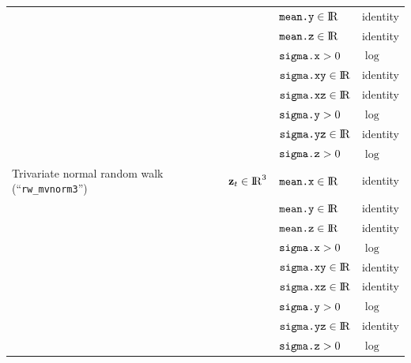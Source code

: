 \documentclass[12pt]{article}\usepackage[]{graphicx}\usepackage[]{color}
\begin{document}
\begin{small}
\begin{table}
\begin{tabular}{llll}
  \rowcolor{Gray}                                       &                                 & $\verb|mean.y|\in{\rm I\!R}$     &  identity \tabularnewline  
  \rowcolor{Gray}                                       &                                 & $\verb|mean.z|\in{\rm I\!R}$     &  identity \tabularnewline  
  \rowcolor{Gray}                                       &                                 & $\verb|sigma.x|>0$               &  $\log$ \tabularnewline                                                
  \rowcolor{Gray}                                       &                                 & $\verb|sigma.xy|\in{\rm I\!R}$   &  identity \tabularnewline
  \rowcolor{Gray}                                       &                                 & $\verb|sigma.xz|\in{\rm I\!R}$   &  identity \tabularnewline          
  \rowcolor{Gray}                                       &                                 & $\verb|sigma.y|>0$               &  $\log$ \tabularnewline   
  \rowcolor{Gray}                                       &                                 & $\verb|sigma.yz|\in{\rm I\!R}$   &  identity \tabularnewline  
  \rowcolor{Gray}                                       &                                 & $\verb|sigma.z|>0$               &  $\log$ \tabularnewline
  Trivariate normal random walk (``\verb|rw_mvnorm3|'') & ${\mathbf z_t}\in{\rm I\!R}^3$  & $\verb|mean.x|\in{\rm I\!R}$     &  identity \tabularnewline  
                                                        &                                 & $\verb|mean.y|\in{\rm I\!R}$     &  identity \tabularnewline  
                                                        &                                 & $\verb|mean.z|\in{\rm I\!R}$     &  identity \tabularnewline  
                                                        &                                 & $\verb|sigma.x|>0$               &  $\log$ \tabularnewline                                                                                                                      &                                 & $\verb|sigma.xy|\in{\rm I\!R}$   &  identity \tabularnewline    
                                                        &                                 & $\verb|sigma.xz|\in{\rm I\!R}$   &  identity \tabularnewline 
                                                        &                                 & $\verb|sigma.y|>0$               &  $\log$ \tabularnewline   
                                                        &                                 & $\verb|sigma.yz|\in{\rm I\!R}$   &  identity \tabularnewline  
                                                        &                                 & $\verb|sigma.z|>0$               &  $\log$ \tabularnewline  

\end{tabular}
\end{table}
\end{small}
\end{document}
